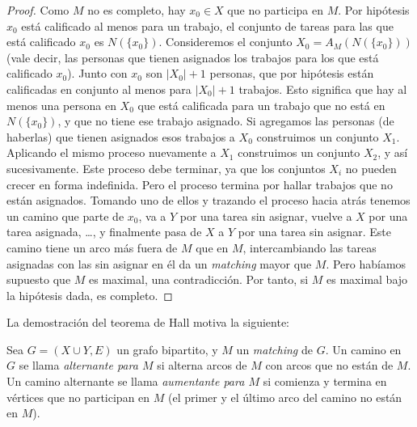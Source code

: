 \begin{proof}
    Como \(M\) no es completo,
    hay \(x_0 \in X\) que no participa en \(M\).
    Por hipótesis \(x_0\) está calificado al menos para un trabajo,
    el conjunto de tareas para las que está calificado \(x_0\)
    es \(N( \{ x_0 \} )\).
    Consideremos el conjunto \(X_0 = A_M(N( \{ x_0 \} ))\)
    (vale decir,
     las personas que tienen asignados los trabajos
     para los que está calificado \(x_0\)).
    Junto con \(x_0\) son \(\lvert X_0 \rvert + 1\) personas,
    que por hipótesis están calificadas en conjunto
    al menos para \(\lvert X_0 \rvert + 1\) trabajos.
    Esto significa que hay al menos una persona en \(X_0\)
    que está calificada para un trabajo
    que no está en \(N(\{ x_0 \})\),
    y que no tiene ese trabajo asignado.
    Si agregamos las personas
    (de haberlas)
    que tienen asignados esos trabajos a \(X_0\)
    construimos un conjunto \(X_1\).
    Aplicando el mismo proceso nuevamente a \(X_1\)
    construimos un conjunto \(X_2\),
    y así sucesivamente.
    Este proceso debe terminar,
    ya que los conjuntos \(X_i\)
    no pueden crecer en forma indefinida.
    Pero el proceso termina por hallar trabajos
    que no están asignados.
    Tomando uno de ellos y trazando el proceso hacia atrás
    tenemos un camino que parte de \(x_0\),
    va a \(Y\) por una tarea sin asignar,
    vuelve a \(X\) por una tarea asignada,
    \ldots,
    y finalmente pasa de \(X\) a \(Y\) por una tarea sin asignar.
    Este camino tiene un arco más fuera de \(M\) que en \(M\),
    intercambiando las tareas asignadas con las sin asignar en él
    da un \emph{\foreignlanguage{english}{matching}}
    mayor que \(M\).
    Pero habíamos supuesto que \(M\) es maximal,
    una contradicción.
    Por tanto,
    si \(M\) es maximal bajo la hipótesis dada,
    es completo.
  \end{proof}

  La demostración del teorema de Hall motiva la siguiente:
  \begin{definition}
    Sea \(G = (X \cup Y, E)\) un grafo bipartito,
    y \(M\) un \emph{\foreignlanguage{english}{matching}} de \(G\).
    Un camino en \(G\)
    se llama \emph{alternante para \(M\)}
    si alterna arcos de \(M\) con arcos que no están de \(M\).
    Un camino alternante se llama \emph{aumentante para \(M\)}
    si comienza y termina en vértices que no participan en \(M\)
    (el primer y el último arco del camino no están en \(M\)).
  \end{definition}

